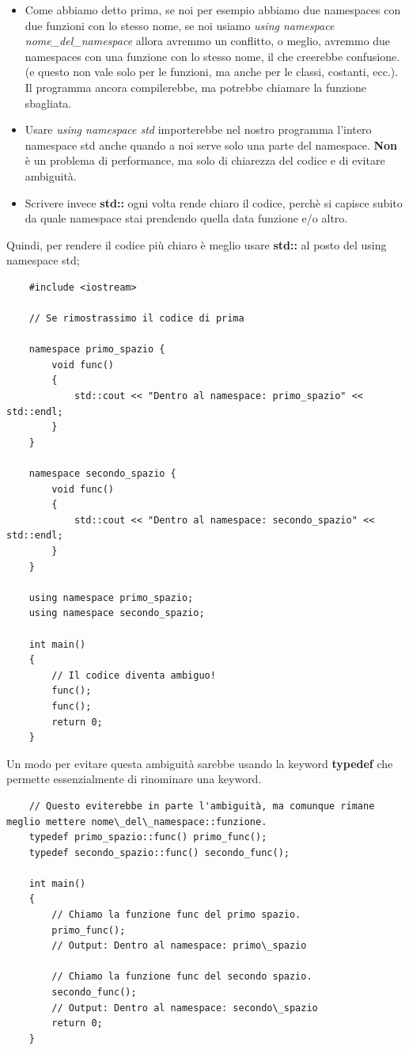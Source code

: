 \begin{itemize}
	\item \textsf{\small Come abbiamo detto prima, se noi per esempio abbiamo due namespaces con due funzioni con lo stesso nome, se noi usiamo \emph{using namespace nome\_del\_namespace} allora avremmo un conflitto, o meglio, avremmo due namespaces con una funzione con lo stesso nome, il che creerebbe confusione. (e questo non vale solo per le funzioni, ma anche per le classi, costanti, ecc.). Il programma ancora compilerebbe, ma potrebbe chiamare la funzione sbagliata.}
	\item \textsf{\small Usare \emph{using namespace std} importerebbe nel nostro programma l'intero namespace std anche quando a noi serve solo una parte del namespace. \textbf{Non} è un problema di performance, ma solo di chiarezza del codice e di evitare ambiguità.}
	\item \textsf{\small Scrivere invece \textbf{std::} ogni volta rende chiaro il codice, perchè si capisce subito da quale namespace stai prendendo quella data funzione e/o altro.}
\end{itemize}

\textsf{\small Quindi, per rendere il codice più chiaro è meglio usare \textbf{std::} al posto del using namespace std;} \\

\begin{lstlisting}
	#include <iostream>
	
	// Se rimostrassimo il codice di prima
	
	namespace primo_spazio {
		void func()
		{
			std::cout << "Dentro al namespace: primo_spazio" << std::endl;
		}
	}
	
	namespace secondo_spazio {
		void func()
		{
			std::cout << "Dentro al namespace: secondo_spazio" << std::endl;
		}
	}

	using namespace primo_spazio;
	using namespace secondo_spazio;
	
	int main()
	{
		// Il codice diventa ambiguo!
		func();
		func();
		return 0;
	}
\end{lstlisting}

\textsf{\small Un modo per evitare questa ambiguità sarebbe usando la keyword \textbf{typedef} che permette essenzialmente di rinominare una keyword.}

\begin{lstlisting}
	// Questo eviterebbe in parte l'ambiguità, ma comunque rimane meglio mettere nome\_del\_namespace::funzione.
	typedef primo_spazio::func() primo_func();
	typedef secondo_spazio::func() secondo_func();
	
	int main()
	{
		// Chiamo la funzione func del primo spazio.
		primo_func();
		// Output: Dentro al namespace: primo\_spazio
		
		// Chiamo la funzione func del secondo spazio.
		secondo_func();
		// Output: Dentro al namespace: secondo\_spazio
		return 0;
	}
\end{lstlisting}

